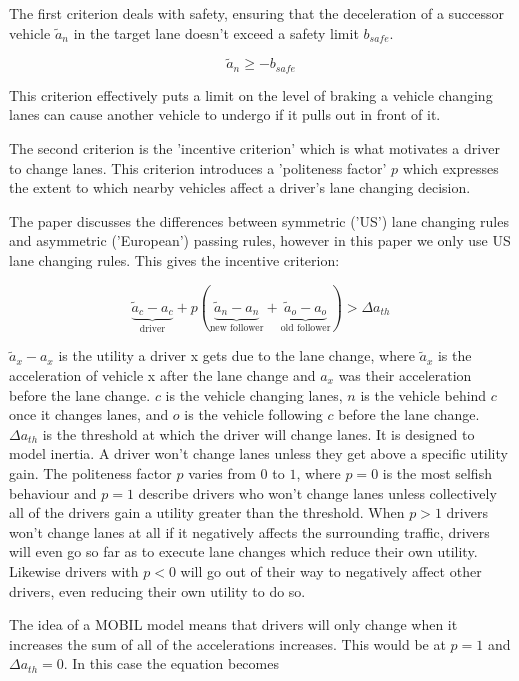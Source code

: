 The first criterion deals with safety, ensuring that the deceleration of a successor vehicle $\tilde{a}_n$ in the target lane doesn't exceed a safety limit $b_{safe}$.

\begin{equation}
\tilde{a}_n \geq -b_{safe}
\end{equation}

This criterion effectively puts a limit on the level of braking a vehicle changing lanes can cause another vehicle to undergo if it pulls out in front of it.

The second criterion is the 'incentive criterion' which is what motivates a driver to change lanes. This criterion introduces a 'politeness factor' $p$ which expresses the extent to which nearby vehicles affect a driver's lane changing decision. 

The paper discusses the differences between symmetric ('US') lane changing rules and asymmetric ('European') passing rules, however in this paper we only use US lane changing rules. This gives the incentive criterion:

\begin{equation}
\underbrace{\tilde{a}_c - a_c}_\text{driver} + p(\underbrace{\tilde{a}_n  - a_n}_\text{new follower} + \underbrace{\tilde{a}_o - a_o}_\text{old follower}) > \Delta a_{th}
\end{equation}

$\tilde{a}_x - a_x$ is the utility a driver x gets due to the lane change, where $\tilde{a}_x$ is the acceleration of vehicle x after the lane change and $a_x$ was their acceleration before the lane change. $c$ is the vehicle changing lanes, $n$ is the vehicle behind $c$ once it changes lanes, and $o$ is the vehicle following $c$ before the lane change. $\Delta a_{th}$ is the threshold at which the driver will change lanes. It is designed to model inertia. A driver won't change lanes unless they get above a specific utility gain. The politeness factor $p$ varies from $0$ to $1$, where $p = 0$ is the most selfish behaviour and $p = 1$ describe drivers who won't change lanes unless collectively all of the drivers gain a utility greater than the threshold. When $p > 1$ drivers won't change lanes at all if it negatively affects the surrounding traffic, drivers will even go so far as to execute lane changes which reduce their own utility. Likewise drivers with $p < 0$ will go out of their way to negatively affect other drivers, even reducing their own utility to do so.

The idea of a MOBIL model means that drivers will only change when it increases the sum of all of the accelerations increases. This would be at $p = 1$ and $\Delta a_{th} = 0$. In this case the equation becomes 

